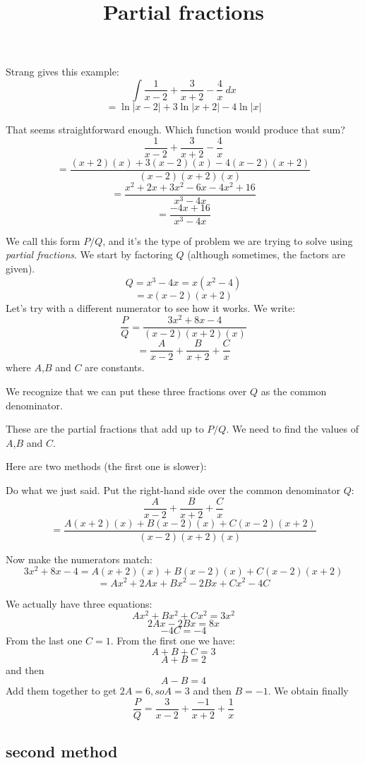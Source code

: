\documentclass[11pt, oneside]{article}
\title{Partial fractions}
\date{}
\begin{document}
\maketitle
\Large

Strang gives this example:
\[ \int \frac{1}{x-2} + \frac{3}{x+2} - \frac{4}{x} \ dx \]
\[ = \ln |x-2| + 3 \ln |x+2| - 4 \ln |x| \]

That seems straightforward enough.  Which function would produce that sum?
\[ \frac{1}{x-2} + \frac{3}{x+2} - \frac{4}{x}  \]
\[ =\frac{(x+2)(x) + 3(x-2)(x) -4(x-2)(x+2)}{(x-2)(x+2)(x)}  \]
\[ =\frac{x^2 + 2x + 3x^2 - 6x - 4x^2 + 16}{x^3 - 4x}  \]
\[ =\frac{- 4x + 16}{x^3 - 4x}  \]

We call this form $P/Q$, and it's the type of problem we are trying to solve using \emph{partial fractions}.  We start by factoring $Q$ (although sometimes, the factors are given).
\[ Q = x^3 - 4x = x(x^2 -4) \]
\[ = x (x-2) (x+2) \]
Let's try with a different numerator to see how it works.  We write:
\[ \frac{P}{Q} = \frac{3x^2 + 8x -4}{(x-2)(x+2)(x)}  \]
\[ = \frac{A}{x-2} + \frac{B}{x+2} + \frac{C}{x} \]
where $A$,$B$ and $C$ are constants.  

We recognize that we can put these three fractions over $Q$ as the common denominator.

These are the partial fractions that add up to $P/Q$.  We need to find the values of $A$,$B$ and $C$.

Here are two methods (the first one is slower):

Do what we just said.  Put the right-hand side over the common denominator $Q$:
\[ \frac{A}{x-2} + \frac{B}{x+2} + \frac{C}{x} \]
\[ = \frac{A(x+2)(x) + B(x-2)(x) + C(x-2)(x+2)}{(x-2)(x+2)(x)} \]

Now make the numerators match:
\[ 3x^2 + 8x -4 = A(x+2)(x) + B(x-2)(x) + C(x-2)(x+2) \]
\[ = Ax^2 + 2Ax + Bx^2 - 2Bx + Cx^2 - 4C \]

We actually have three equations:
\[ Ax^2 + Bx^2 + Cx^2 = 3x^2 \]
\[ 2Ax - 2Bx = 8x \]
\[ -4C = -4 \]
From the last one $C=1$.  From the first one we have:
\[ A + B + C = 3 \]
\[ A + B = 2 \]
and then
\[ A - B = 4 \]
Add them together to get $2A = 6, so A = 3$ and then $B = -1$.
We obtain finally
\[ \frac{P}{Q} = \frac{3}{x-2} + \frac{-1}{x+2} + \frac{1}{x} \]

\subsection*{second method}
\end{document}
